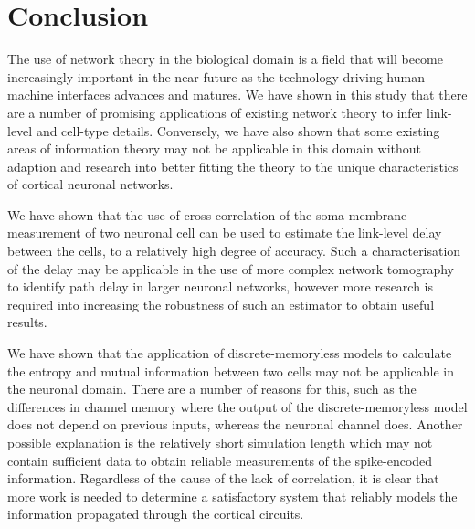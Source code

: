 \chapter{Conclusion}
\label{chap:conc}


The use of network theory in the biological domain is a field that will become increasingly important in the near future as the technology driving human-machine interfaces advances and matures. We have shown in this study that there are a number of promising applications of existing network theory to infer link-level and cell-type details. Conversely, we have also shown that some existing areas of information theory may not be applicable in this domain without adaption and research into better fitting the theory to the unique characteristics of cortical neuronal networks.

\par

We have shown that the use of cross-correlation of the soma-membrane measurement of two neuronal cell can be used to estimate the link-level delay between the cells, to a relatively high degree of accuracy. Such a characterisation of the delay may be applicable in the use of more complex network tomography to identify path delay in larger neuronal networks, however more research is required into increasing the robustness of such an estimator to obtain useful results.

\par

We have shown that the application of discrete-memoryless models to calculate the entropy and mutual information between two cells may not be applicable in the neuronal domain. There are a number of reasons for this, such as the differences in channel memory where the output of the discrete-memoryless model does not depend on previous inputs, whereas the neuronal channel does. Another possible explanation is the relatively short simulation length which may not contain sufficient data to obtain reliable measurements of the spike-encoded information. Regardless of the cause of the lack of correlation, it is clear that more work is needed to determine a satisfactory system that reliably models the information propagated through the cortical circuits.

